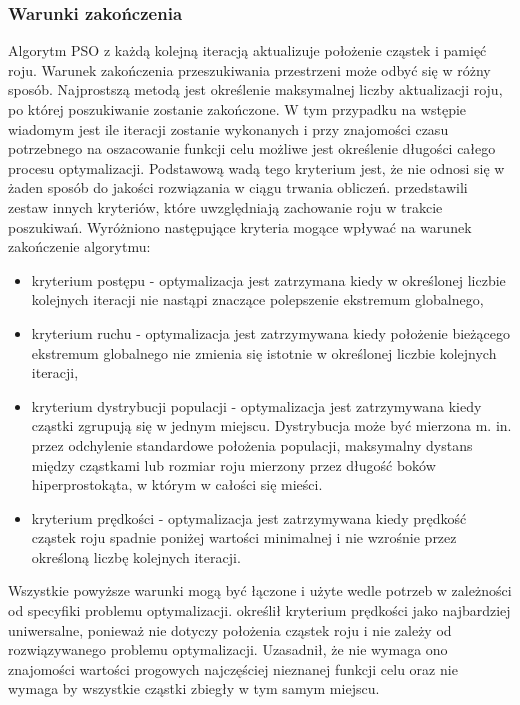 \subsubsection{Warunki zakończenia}
Algorytm PSO z każdą kolejną iteracją aktualizuje położenie cząstek i pamięć roju. Warunek zakończenia przeszukiwania przestrzeni może odbyć się w różny sposób. Najprostszą metodą jest określenie maksymalnej liczby aktualizacji roju, po której poszukiwanie zostanie zakończone. W tym przypadku na wstępie wiadomym jest ile iteracji zostanie wykonanych i przy znajomości czasu potrzebnego na oszacowanie funkcji celu możliwe jest określenie długości całego procesu optymalizacji. Podstawową wadą tego kryterium jest, że nie odnosi się w żaden sposób do jakości rozwiązania w ciągu trwania obliczeń. \parencite{Zielinski2007} przedstawili zestaw innych kryteriów, które uwzględniają zachowanie roju w trakcie poszukiwań. Wyróżniono następujące kryteria mogące wpływać na warunek zakończenie algorytmu:
\begin{itemize}[noitemsep]
	\item kryterium postępu - optymalizacja jest zatrzymana kiedy w określonej liczbie kolejnych iteracji nie nastąpi znaczące polepszenie ekstremum globalnego,
	\item kryterium ruchu - optymalizacja jest zatrzymywana kiedy położenie bieżącego ekstremum globalnego nie zmienia się istotnie w określonej liczbie kolejnych iteracji,
	\item kryterium dystrybucji populacji - optymalizacja jest zatrzymywana kiedy cząstki zgrupują się w jednym miejscu. Dystrybucja może być mierzona m. in. przez odchylenie standardowe położenia populacji, maksymalny dystans między cząstkami lub rozmiar roju mierzony przez długość boków hiperprostokąta, w którym w całości się mieści.  
	\item kryterium prędkości - optymalizacja jest zatrzymywana kiedy prędkość cząstek roju spadnie poniżej wartości minimalnej i nie wzrośnie przez określoną liczbę kolejnych iteracji. 
\end{itemize}
Wszystkie powyższe warunki mogą być łączone i użyte wedle potrzeb w zależności od specyfiki problemu optymalizacji. \cite{Banach2017} określił kryterium prędkości jako najbardziej uniwersalne, ponieważ nie dotyczy położenia cząstek roju i nie zależy od rozwiązywanego problemu optymalizacji. Uzasadnił, że nie wymaga ono znajomości wartości progowych najczęściej nieznanej funkcji celu oraz nie wymaga by wszystkie cząstki zbiegły w tym samym miejscu.

